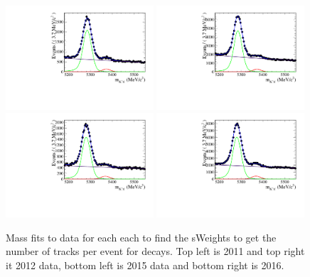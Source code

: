 \begin{figure}[ht]
  \centering
    \includegraphics[width=0.49\textwidth]{./Figs/LifetimeMeasurement/2011_Bd2KPi_mass.pdf}
    \includegraphics[width=0.49\textwidth]{./Figs/LifetimeMeasurement/2012_Bd2KPi_mass.pdf}
    \includegraphics[width=0.49\textwidth]{./Figs/LifetimeMeasurement/2015_Bd2KPi_mass.pdf}
    \includegraphics[width=0.49\textwidth]{./Figs/LifetimeMeasurement/2016_Bd2KPi_mass.pdf}
  \caption{Mass fits to \bdkpi data for each each to find the sWeights to get the number of tracks per event for \bdkpi decays. Top left is 2011 and top right it 2012 data, bottom left is 2015 data and bottom right is 2016.}
  \label{fig:ntracksmassifts}
\end{figure}
\FloatBarrier


